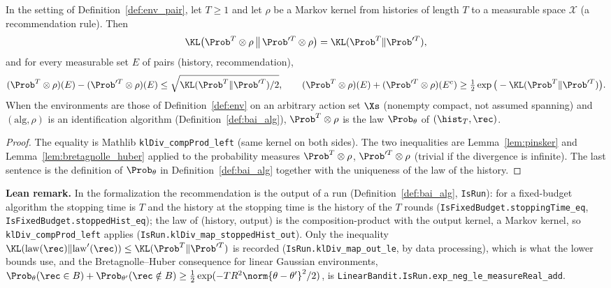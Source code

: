 \begin{lemma}
\label{lem:kl_data_processing_recommendation}
\leanok
{}
In the setting of Definition~\ref{def:env_pair}, let $T \ge 1$ and let $\rho$ be a Markov
kernel from histories of length $T$ to a measurable space $\mathcal{X}$ (a recommendation rule).
Then
\[
  \KL\big(\Prob^T\otimes\rho\,\big\|\,\Prob'^T\otimes\rho\big) = \KL(\Prob^T\|\Prob'^T),
\]
and for every measurable set $E$ of pairs (history, recommendation),
\[
  (\Prob^T\otimes\rho)(E) - (\Prob'^T\otimes\rho)(E) \le \sqrt{\KL(\Prob^T\|\Prob'^T)/2},
  \qquad
  (\Prob^T\otimes\rho)(E) + (\Prob'^T\otimes\rho)(E^c) \ge \tfrac12\exp\big(-\KL(\Prob^T\|\Prob'^T)\big).
\]
When the environments are those of Definition~\ref{def:env} on an arbitrary action set
$\Xs$ (nonempty compact, not assumed spanning) and $(\mathrm{alg},\rho)$ is an
identification algorithm (Definition~\ref{def:bai_alg}), $\Prob^T\otimes\rho$ is the law
$\Prob_\theta$ of $(\hist_T,\rec)$.
\end{lemma}

\begin{proof}
\leanok
{}
The equality is Mathlib \texttt{klDiv\_compProd\_left} (same kernel on both sides). The two
inequalities are Lemma~\ref{lem:pinsker} and Lemma~\ref{lem:bretagnolle_huber} applied to the
probability measures $\Prob^T\otimes\rho$, $\Prob'^T\otimes\rho$ (trivial if the divergence is
infinite). The last sentence is the definition of $\Prob_\theta$ in
Definition~\ref{def:bai_alg} together with the uniqueness of the law of the history.
\end{proof}

\textbf{Lean remark.} In the formalization the recommendation is the output of a run
(Definition~\ref{def:bai_alg}, \texttt{IsRun}): for a fixed-budget algorithm the stopping time is
$T$ and the history at the stopping time is the history of the $T$ rounds
(\texttt{IsFixedBudget.stoppingTime\_eq}, \texttt{IsFixedBudget.stoppedHist\_eq}); the law of
(history, output) is the composition-product with the output kernel, a Markov kernel, so
\texttt{klDiv\_compProd\_left} applies (\texttt{IsRun.klDiv\_map\_stoppedHist\_out}). Only the
inequality
$\KL(\mathrm{law}(\rec)\|\mathrm{law}'(\rec)) \le \KL(\Prob^T\|\Prob'^T)$ is recorded
(\texttt{IsRun.klDiv\_map\_out\_le}, by data processing), which is what the lower bounds use, and
the Bretagnolle--Huber consequence for linear Gaussian environments,
$\Prob_\theta(\rec\in B) + \Prob_{\theta'}(\rec\notin B) \ge \tfrac12\exp(-TR^2\norm{\theta-\theta'}^2/2)$,
is \texttt{LinearBandit.IsRun.exp\_neg\_le\_measureReal\_add}.


